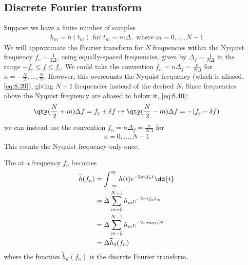 \subsection{Discrete Fourier transform}
Suppose we have a finite number of samples 
\begin{align} \label{eq:8.45}
	h_m = h(t_m) \text{ for } t_m = m \Delta, \text{ where } m = 0,\dots, N-1
\end{align}
We will approximate the Fourier transform for $N$ frequencies within the Nyquist frequency $f_c = \frac{1}{2\Delta}$, using equally-spaced frequencies, given by $\Delta_f = \frac{1}{N\Delta}$ in the range $-f_c \leq f \leq f_c$.
We could take the convention $f_n = n \Delta_f = \frac{n}{N\Delta}$ for $n = -\frac{N}{2}, \dots, \frac{N}{2}$.
However, this overcounts the Nyquist frequency (which is aliased, \cref{eq:8.39}), giving $N + 1$ frequencies instead of the desired $N$.
Since frequencies above the Nyquist frequency are aliased to below it, \cref{eq:8.40}:
\begin{align*}
	\qty(\frac{N}{2} + m) \Delta f = f_c + \delta f \mapsto \qty(\frac{N}{2} - m)\Delta f = -(f_c - \delta f)
\end{align*}
we can instead use the convention $f_n = n \Delta_f = \frac{n}{N\Delta}$ for
\begin{align} \label{eq:8.46}
	n = 0, \dots, N - 1
\end{align} 
This counts the Nyquist frequency only once.

The  at a frequency $f_n$ becomes
\begin{align}
	\widetilde h(f_n) & = \int_{-\infty}^\infty h(t) e^{-2\pi if_n t} \dd{t} \notag \\
	& \approx \Delta \sum_{m=0}^{N-1} h_m e^{-2\pi i f_n t_m} \notag \\
	& = \Delta \sum_{m=0}^{N-1} h_m e^{-2\pi i m n / N} \notag \\
	& = \Delta \widetilde h_d(f_n) \label{eq:8.47}
\end{align}
where the function $\widetilde h_d(f_n)$ is the discrete Fourier transform.

